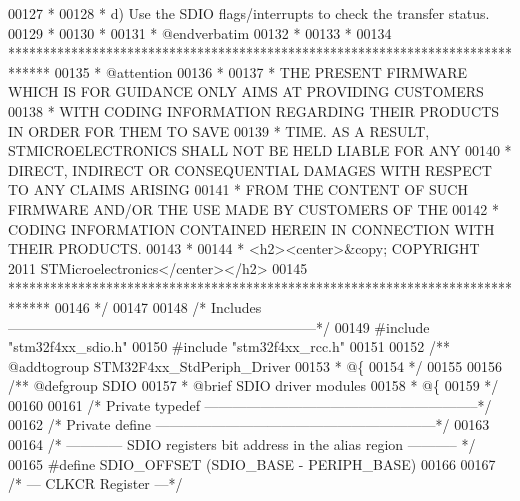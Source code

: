 \begin{DoxyCode}
00127 \textcolor{comment}{  *                  }
00128 \textcolor{comment}{  *              d) Use the SDIO flags/interrupts to check the transfer status.}
00129 \textcolor{comment}{  *}
00130 \textcolor{comment}{  *}
00131 \textcolor{comment}{  *  @endverbatim}
00132 \textcolor{comment}{  *}
00133 \textcolor{comment}{  *}
00134 \textcolor{comment}{  ******************************************************************************}
00135 \textcolor{comment}{  * @attention}
00136 \textcolor{comment}{  *}
00137 \textcolor{comment}{  * THE PRESENT FIRMWARE WHICH IS FOR GUIDANCE ONLY AIMS AT PROVIDING CUSTOMERS}
00138 \textcolor{comment}{  * WITH CODING INFORMATION REGARDING THEIR PRODUCTS IN ORDER FOR THEM TO SAVE}
00139 \textcolor{comment}{  * TIME. AS A RESULT, STMICROELECTRONICS SHALL NOT BE HELD LIABLE FOR ANY}
00140 \textcolor{comment}{  * DIRECT, INDIRECT OR CONSEQUENTIAL DAMAGES WITH RESPECT TO ANY CLAIMS ARISING}
00141 \textcolor{comment}{  * FROM THE CONTENT OF SUCH FIRMWARE AND/OR THE USE MADE BY CUSTOMERS OF THE}
00142 \textcolor{comment}{  * CODING INFORMATION CONTAINED HEREIN IN CONNECTION WITH THEIR PRODUCTS.}
00143 \textcolor{comment}{  *}
00144 \textcolor{comment}{  * <h2><center>&copy; COPYRIGHT 2011 STMicroelectronics</center></h2>}
00145 \textcolor{comment}{  ******************************************************************************}
00146 \textcolor{comment}{  */}
00147 
00148 \textcolor{comment}{/* Includes ------------------------------------------------------------------*/}
00149 \textcolor{preprocessor}{#}\textcolor{preprocessor}{include} "stm32f4xx_sdio.h"
00150 \textcolor{preprocessor}{#}\textcolor{preprocessor}{include} "stm32f4xx_rcc.h"
00151 
00152 \textcolor{comment}{/** @addtogroup STM32F4xx\_StdPeriph\_Driver}
00153 \textcolor{comment}{  * @\{}
00154 \textcolor{comment}{  */}
00155 
00156 \textcolor{comment}{/** @defgroup SDIO }
00157 \textcolor{comment}{  * @brief SDIO driver modules}
00158 \textcolor{comment}{  * @\{}
00159 \textcolor{comment}{  */}
00160 
00161 \textcolor{comment}{/* Private typedef -----------------------------------------------------------*/}
00162 \textcolor{comment}{/* Private define ------------------------------------------------------------*/}
00163 
00164 \textcolor{comment}{/* ------------ SDIO registers bit address in the alias region ----------- */}
00165 \textcolor{preprocessor}{#}\textcolor{preprocessor}{define} \textcolor{preprocessor}{SDIO\_OFFSET}                \textcolor{preprocessor}{(}SDIO_BASE \textcolor{preprocessor}{-} PERIPH_BASE\textcolor{preprocessor}{)}
00166 
00167 \textcolor{comment}{/* --- CLKCR Register ---*/}

\end{DoxyCode}
